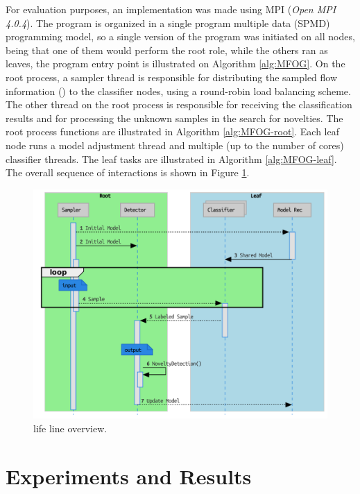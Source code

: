 For evaluation purposes, an \mfog implementation was made using MPI (\emph{Open
MPI 4.0.4}).
The program is organized in a single program multiple data (SPMD)
programming model, so a single version of the \mfog program was initiated on all
nodes, being that one of them would perform the root role, while the others ran
as leaves, the program entry point is illustrated on Algorithm \ref{alg:MFOG}.
On the root process, a sampler thread is responsible for distributing the
sampled flow information (\val) to the classifier nodes, using a round-robin
load balancing scheme.
The other thread on the root process is responsible for receiving the
classification results and for processing the unknown samples in the search for
novelties.
The root process functions are illustrated in Algorithm \ref{alg:MFOG-root}.
Each leaf node runs a model adjustment thread and multiple (up to the number of
cores) classifier threads. The leaf tasks are illustrated in Algorithm
\ref{alg:MFOG-leaf}.
The overall sequence of interactions is shown in Figure \ref{fig:mfog-mpi-life}.

\begin{figure}[htb]
  \centerline{
    \includegraphics[width=\linewidth,page=1]{figures/lifecycle.uml.svg.pdf}
  }
  \caption{\mfog life line overview.}
  \label{fig:mfog-mpi-life}
\end{figure}


\section{Experiments and Results}
\label{sec:experiments}

